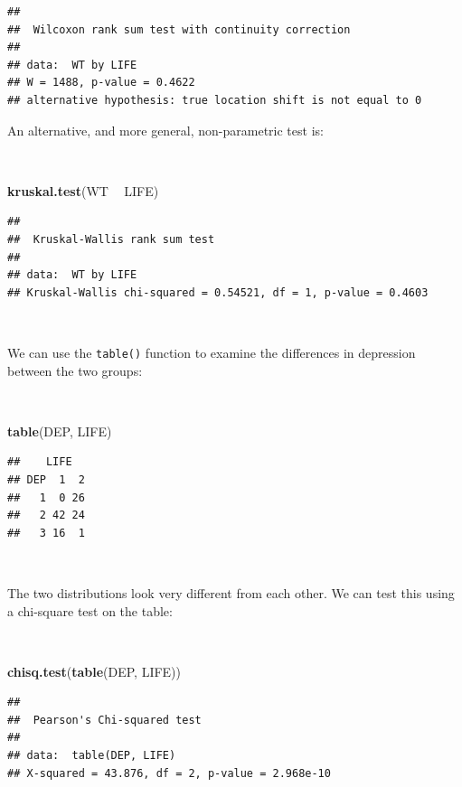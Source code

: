 \documentclass[12pt,a4paper]{book}
\newenvironment{Shaded}{\begin{snugshade}}{\end{snugshade}}
\newcommand{\KeywordTok}[1]{\textcolor[rgb]{0.13,0.29,0.53}{\textbf{#1}}}
\newcommand{\StringTok}[1]{\textcolor[rgb]{0.31,0.60,0.02}{#1}}
\newcommand{\OperatorTok}[1]{\textcolor[rgb]{0.81,0.36,0.00}{\textbf{#1}}}
\newcommand{\NormalTok}[1]{#1}
\theoremstyle{definition}
\theoremstyle{definition}
\theoremstyle{definition}
\theoremstyle{remark}
\begin{document}
\begin{verbatim}
## 
##  Wilcoxon rank sum test with continuity correction
## 
## data:  WT by LIFE
## W = 1488, p-value = 0.4622
## alternative hypothesis: true location shift is not equal to 0
\end{verbatim}

\newpage

An alternative, and more general, non-parametric test is:

~

\begin{Shaded}
\begin{Highlighting}[]
\KeywordTok{kruskal.test}\NormalTok{(WT }\OperatorTok{~}\StringTok{ }\NormalTok{LIFE)}
\end{Highlighting}
\end{Shaded}

\begin{verbatim}
## 
##  Kruskal-Wallis rank sum test
## 
## data:  WT by LIFE
## Kruskal-Wallis chi-squared = 0.54521, df = 1, p-value = 0.4603
\end{verbatim}

~

We can use the \texttt{table()} function to examine the differences in
depression between the two groups:

~

\begin{Shaded}
\begin{Highlighting}[]
\KeywordTok{table}\NormalTok{(DEP, LIFE)}
\end{Highlighting}
\end{Shaded}

\begin{verbatim}
##    LIFE
## DEP  1  2
##   1  0 26
##   2 42 24
##   3 16  1
\end{verbatim}

~

The two distributions look very different from each other. We can test
this using a chi-square test on the table:

~

\begin{Shaded}
\begin{Highlighting}[]
\KeywordTok{chisq.test}\NormalTok{(}\KeywordTok{table}\NormalTok{(DEP, LIFE))}
\end{Highlighting}
\end{Shaded}

\begin{verbatim}
## 
##  Pearson's Chi-squared test
## 
## data:  table(DEP, LIFE)
## X-squared = 43.876, df = 2, p-value = 2.968e-10
\end{verbatim}
\end{document}
